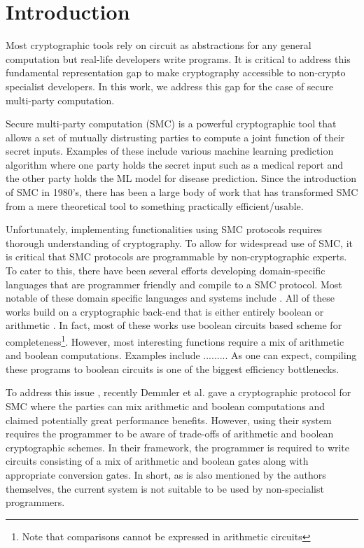 \section{Introduction}
\label{sec:intro}

Most cryptographic tools rely on circuit as abstractions for any general computation but real-life developers write programs. It is critical to address this fundamental  representation gap to make cryptography accessible to non-crypto specialist developers. In this work, we address this gap for the case of secure multi-party computation.

Secure multi-party computation \cite{yao,gmw} (SMC) is a powerful cryptographic tool that allows a set of mutually distrusting parties to compute a joint function of their secret inputs. Examples of these include various machine learning prediction algorithm where one party holds the secret input such as a medical report and the other party holds the ML model for disease prediction. Since the introduction of SMC in 1980's, there has been a large body of work \cite{..} that has transformed SMC from a mere theoretical tool to something practically efficient/usable.

Unfortunately, implementing functionalities using SMC protocols requires thorough understanding of cryptography. To allow for widespread use of SMC, it is critical that SMC protocols are programmable by non-cryptographic experts. To cater to this, there have been several efforts developing domain-specific languages that are programmer friendly and compile to a SMC protocol. Most notable of these domain specific languages and systems include \cite{...}. All of these works build on a cryptographic back-end that is either entirely boolean \cite{yao,gmw} or arithmetic \cite{homo}. In fact, most of these works use boolean circuits based scheme for completeness\footnote{Note that comparisons cannot be expressed in arithmetic circuits}. However, most interesting functions require a mix of arithmetic and boolean computations.  Examples include ......... As one can expect, compiling these programs to boolean circuits is one of the biggest efficiency bottlenecks. 

To address this issue , recently Demmler et al. \cite{aby} gave a cryptographic protocol for SMC where the parties can mix arithmetic and boolean computations and claimed potentially great performance benefits. However, using their system requires the programmer to be aware of trade-offs of arithmetic and boolean cryptographic schemes. In their framework, the programmer is required to write circuits consisting of a mix of arithmetic and boolean gates along with appropriate conversion gates. In short, as is also mentioned by the authors themselves, the current system is not suitable to be used by non-specialist programmers.


